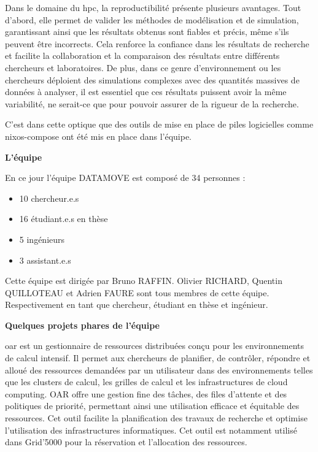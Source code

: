 \documentclass[a4paper,french,12pt, titlepage]{article}
\begin{document}
Dans le domaine du \Gls{hpc}, la reproductibilité présente plusieurs
avantages. Tout d'abord, elle permet de valider les méthodes de
modélisation et de simulation, garantissant ainsi que les résultats
obtenus sont fiables et précis, même s'ils peuvent être incorrects. Cela
renforce la confiance dans les résultats de recherche et facilite la
collaboration et la comparaison des résultats entre différents
chercheurs et laboratoires. De plus, dans ce genre d'environnement ou
les chercheurs déploient des simulations complexes avec des quantités
massives de données à analyser, il est essentiel que ces résultats
puissent avoir la même variabilité, ne serait-ce que pour pouvoir
assurer de la rigueur de la recherche.\newline

C'est dans cette optique que des outils de mise en place de piles
logicielles comme \Gls{nixos-compose} ont été mis en place dans
l'équipe.\newline

\textbf{L'équipe}\newline

En ce jour l'équipe DATAMOVE est composé de 34 personnes :

\begin{itemize}
\item
  10 chercheur.e.s
\item
  16 étudiant.e.s en thèse
\item
  5 ingénieurs
\item
  3 assistant.e.s\newline
\end{itemize}

Cette équipe est dirigée par Bruno RAFFIN. Olivier RICHARD, Quentin
QUILLOTEAU et Adrien FAURE sont tous membres de cette équipe.
Respectivement en tant que chercheur, étudiant en thèse et
ingénieur.\newline

\textbf{Quelques projets phares de l'équipe}\newline

\Gls{oar} est un gestionnaire de ressources distribuées conçu pour les
environnements de calcul intensif. Il permet aux chercheurs de
planifier, de contrôler, répondre et alloué des ressources demandées par
un utilisateur dans des environnements telles que les clusters de
calcul, les grilles de calcul et les infrastructures de cloud computing.
OAR offre une gestion fine des tâches, des files d'attente et des
politiques de priorité, permettant ainsi une utilisation efficace et
équitable des ressources. Cet outil facilite la planification des
travaux de recherche et optimise l'utilisation des infrastructures
informatiques. Cet outil est notamment utilisé dans Grid'5000 pour la
réservation et l'allocation des ressources.\newline
\end{document}
